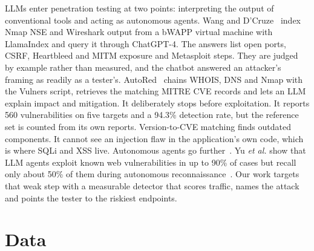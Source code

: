 \documentclass[conference]{IEEEtran}
\begin{document}
LLMs enter penetration testing at two points: interpreting the output of conventional tools and acting as autonomous agents. Wang and D'Cruze~\cite{wang2024} index Nmap NSE and Wireshark output from a bWAPP virtual machine with LlamaIndex and query it through ChatGPT-4. The answers list open ports, CSRF, Heartbleed and MITM exposure and Metasploit steps. They are judged by example rather than measured, and the chatbot answered an attacker's framing as readily as a tester's. AutoRed~\cite{khairmode2026} chains WHOIS, DNS and Nmap with the Vulners script, retrieves the matching MITRE CVE records and lets an LLM explain impact and mitigation. It deliberately stops before exploitation. It reports 560 vulnerabilities on five targets and a 94.3\% detection rate, but the reference set is counted from its own reports. Version-to-CVE matching finds outdated components. It cannot see an injection flaw in the application's own code, which is where SQLi and XSS live. Autonomous agents go further~\cite{deng2024,shen2025}. Yu \emph{et al.} show that LLM agents exploit known web vulnerabilities in up to 90\% of cases but recall only about 50\% of them during autonomous reconnaissance~\cite{yu2026}. Our work targets that weak step with a measurable detector that scores traffic, names the attack and points the tester to the riskiest endpoints.

\section{Data}



\end{document}

